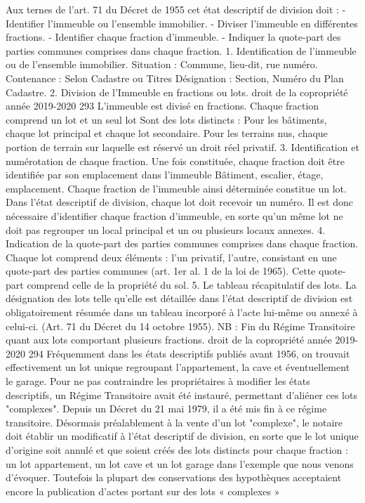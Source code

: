 		Aux ternes de l'art. 71 du Décret de 1955 cet état descriptif de division doit :
		- Identifier l'immeuble ou l'ensemble immobilier.
		- Diviser l'immeuble en différentes fractions.
		- Identifier chaque fraction d'immeuble.
		- Indiquer la quote-part des parties communes comprises dans chaque fraction.
		1. Identification de l'immeuble ou de l'ensemble immobilier.
		Situation : Commune, lieu-dit, rue numéro.
		Contenance : Selon Cadastre ou Titres
		Désignation : Section, Numéro du Plan Cadastre.
		2. Division de l'Immeuble en fractions ou lots.
		droit de la copropriété année 2019-2020
		293
		L'immeuble est divisé en fractions. Chaque fraction comprend un lot et un seul lot
		Sont des lots distincts :
		Pour les bâtiments, chaque lot principal et chaque lot secondaire.
		Pour les terrains nus, chaque portion de terrain sur laquelle est réservé un droit réel privatif.
		3. Identification et numérotation de chaque fraction.
		Une fois constituée, chaque fraction doit être identifiée par son emplacement dans l'immeuble
		Bâtiment, escalier, étage, emplacement.
		Chaque fraction de l'immeuble ainsi déterminée constitue un lot. Dans l'état descriptif de division, chaque lot doit recevoir un numéro.
		Il est donc nécessaire d'identifier chaque fraction d'immeuble, en sorte qu'un même lot ne doit pas regrouper un local principal et un ou plusieurs locaux annexes.
		4. Indication de la quote-part des parties communes comprises dans chaque fraction.
		Chaque lot comprend deux éléments : l'un privatif, l'autre, consistant en une quote-part des parties communes (art. 1er al. 1 de la loi de 1965).
		Cette quote-part comprend celle de la propriété du sol.
		5. Le tableau récapitulatif des lots.
		La désignation des lots telle qu'elle est détaillée dans l'état descriptif de division est obligatoirement résumée dans un tableau incorporé à l'acte lui-même ou annexé à celui-ci. (Art. 71 du Décret du 14 octobre 1955).
		NB : Fin du Régime Transitoire quant aux lots comportant plusieurs fractions.
		droit de la copropriété année 2019-2020
		294
		Fréquemment dans les états descriptifs publiés avant 1956, on trouvait effectivement un lot unique regroupant l'appartement, la cave et éventuellement le garage.
		Pour ne pas contraindre les propriétaires à modifier les états descriptifs, un Régime Transitoire avait été instauré, permettant d'aliéner ces lots "complexes". Depuis un Décret du 21 mai 1979, il a été mis fin à ce régime transitoire. Désormais préalablement à la vente d'un lot "complexe", le notaire doit établir un modificatif à l'état descriptif de division, en sorte que le lot unique d'origine soit annulé et que soient créés des lots distincts pour chaque fraction : un lot appartement, un lot cave et un lot garage dans l'exemple que nous venons d'évoquer. Toutefois la plupart des conservations des hypothèques acceptaient encore la publication d’actes portant sur des lots « complexes »

